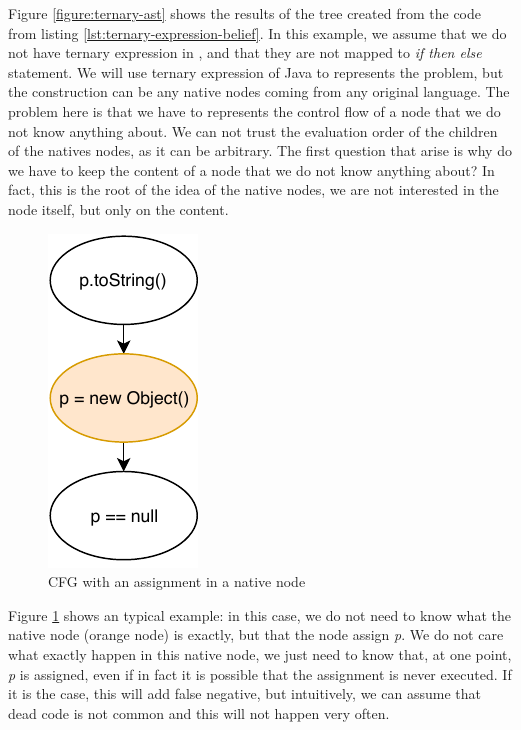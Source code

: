 Figure \ref{figure:ternary-ast} shows the results of the \slang{} tree created from the code from listing \ref{lst:ternary-expression-belief}. 
In this example, we assume that we do not have ternary expression in \slang{}, and that they are not mapped to \emph{if then else} statement. 
We will use ternary expression of Java to represents the problem, but the construction can be any native nodes coming from any original language. \newline
The problem here is that we have to represents the control flow of a node that we do not know anything about. 
We can not trust the evaluation order of the children of the natives nodes, as it can be arbitrary. 
The first question that arise is why do we have to keep the content of a node that we do not know anything about? In fact, this is the root of the idea of the native nodes, we are not interested in the node itself, but only on the content. 

\begin{figure}[h]
	\caption{CFG with an assignment in a native node}
	\label{figure:cfg-with-assignment-native}
	\includegraphics[]{figure/cfg-with-assignment-native.pdf}
\end{figure}

Figure \ref{figure:cfg-with-assignment-native} shows an typical example: in this case, we do not need to know what the native node (orange node) is exactly, but that the node assign \emph{p}. We do not care what exactly happen in this native node, we just need to know that, at one point, \emph{p} is assigned, even if in fact it is possible that the assignment is never executed. If it is the case, this will add false negative, but intuitively, we can assume that dead code is not common and this will not happen very often.

